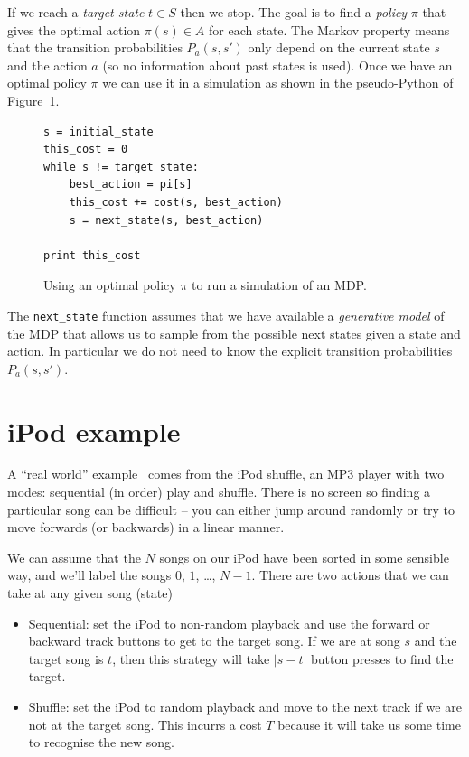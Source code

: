 \documentclass[10pt,amstags,fleqn]{article}
\theoremstyle{plain}
\theoremstyle{definition}
\theoremstyle{definition}
\begin{document}
If we reach a {\em target state} $t \in S$ then we stop.  
The goal is to find a {\em policy} $\pi$ that gives the optimal action
$\pi(s) \in A$ for each state.
The Markov property means that the transition probabilities
$P_a(s,s')$ only depend on the current state $s$ and the action $a$
(so no information about past states is used).
Once we have an optimal policy $\pi$ we can use it in a simulation as
shown in the pseudo-Python of Figure~\ref{mdpsim}.
\begin{figure}[htb]
\begin{verbatim}
s = initial_state
this_cost = 0
while s != target_state:
    best_action = pi[s]
    this_cost += cost(s, best_action)
    s = next_state(s, best_action)

print this_cost
\end{verbatim}
\caption{Using an optimal policy $\pi$ to run a simulation of an MDP.}\label{mdpsim}
\end{figure}
The \texttt{next\_state} function assumes that we have available a 
{\em generative model} of the MDP that allows us to sample from the
possible next states given a state and action. In particular we do not
need to know the explicit transition probabilities $P_a(s,s')$.


\section{iPod example}

A ``real world'' example~\cite{ipodnorvig} comes from the iPod
shuffle, an MP3 player with two modes: sequential (in order) play
and shuffle. There is no screen so finding a particular song can
be difficult -- you can either jump around randomly or try to move
forwards (or backwards) in a linear manner.

We can assume that the $N$ songs on our iPod have been sorted in some
sensible way, and we'll label the songs $0$, $1$, \dots, $N-1$.
There are two actions that we can take at any given song (state)

\begin{itemize}

\item Sequential: set the iPod to non-random playback and use the
forward or backward track buttons to get to the target song. If we
are at song $s$ and the target song is $t$, then this strategy will take
$\left| s - t \right|$ button presses to find the target.

\item Shuffle: set the iPod to random playback and move to the next
track if we are not at the target song. This incurrs a cost $T$ because
it will take us some time to recognise the new song.

\end{itemize}
\end{document}
